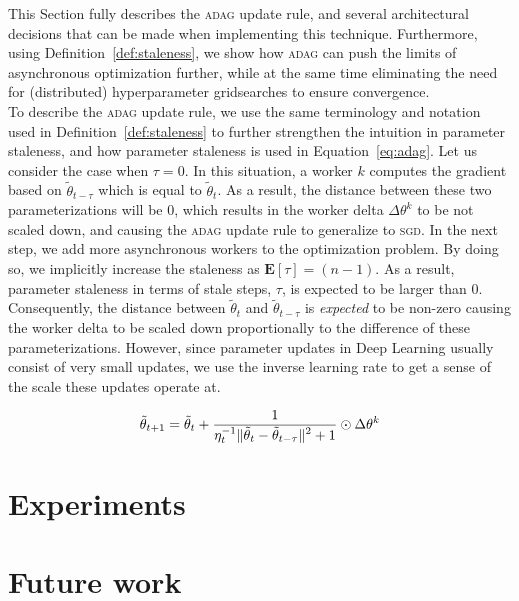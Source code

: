 This Section fully describes the \textsc{adag} update rule, and several architectural decisions that can be made when implementing this technique. Furthermore, using Definition~\ref{def:staleness}, we show how \textsc{adag} can push the limits of asynchronous optimization further, while at the same time eliminating the need for (distributed) hyperparameter gridsearches to ensure convergence.\\

To describe the \textsc{adag} update rule, we use the same terminology and notation used in Definition~\ref{def:staleness} to further strengthen the intuition in parameter staleness, and how parameter staleness is used in Equation~\ref{eq:adag}. Let us consider the case when $\tau = 0$. In this situation, a worker $k$ computes the gradient based on $\tilde{\theta}_{t-\tau}$ which is equal to $\tilde{\theta}_t$. As a result, the distance between these two parameterizations will be 0, which results in the worker delta $\Delta\theta^k$ to be not scaled down, and causing the \textsc{adag} update rule to generalize to \textsc{sgd}. In the next step, we add more asynchronous workers to the optimization problem. By doing so, we implicitly increase the staleness as $\mathbf{E}[\tau] = (n - 1)$. As a result, parameter staleness in terms of stale steps, $\tau$, is expected to be larger than 0. Consequently, the distance between $\tilde{\theta}_t$ and $\tilde{\theta}_{t - \tau}$ is \emph{expected} to be non-zero causing the worker delta to be scaled down proportionally to the difference of these parameterizations. However, since parameter updates in Deep Learning usually consist of very small updates, we use the inverse learning rate to get a sense of the scale these updates operate at.

\begin{equation}
  \label{eq:adag}
  \tilde{\theta}_{t+1} = \tilde{\theta}_t + \frac{\displaystyle 1}{\displaystyle \eta_t^{-1}\|\tilde{\theta}_t - \tilde{\theta}_{t - \tau}\|^2 + 1} \odot \Delta\theta^k
\end{equation}

\section{Experiments}
\label{sec:adag_experiments}

\section{Future work}
\label{sec:adag_future_work}
